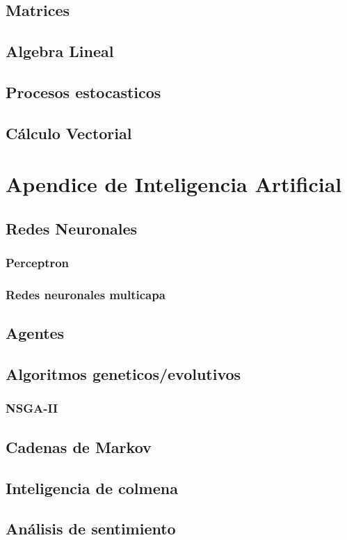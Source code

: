     \section{Matrices}
    \section{Algebra Lineal}
    \section{Procesos estocasticos}
    \section{Cálculo Vectorial}
    
\chapter{Apendice de Inteligencia Artificial}
    \section{Redes Neuronales}
        \subsection{Perceptron}
        \subsection{Redes neuronales multicapa}
    \section{Agentes}
    \section{Algoritmos geneticos/evolutivos}
        \subsection{NSGA-II}
    \section{Cadenas de Markov}
    \section{Inteligencia de colmena}
    \section{Análisis de sentimiento}
